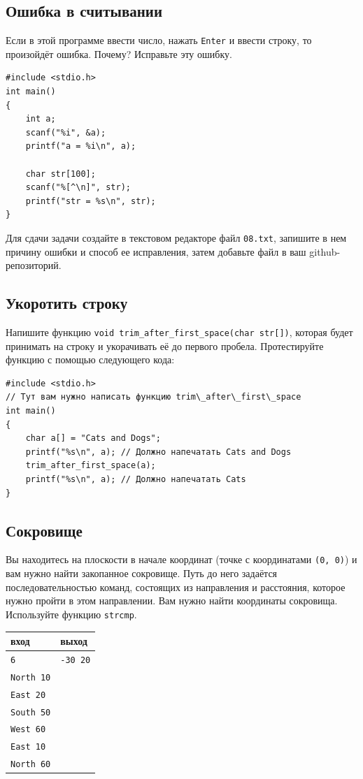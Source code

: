 \documentclass{article}
\begin{document}
\subsection{Ошибка в считывании}
Если в этой программе ввести число, нажать \texttt{Enter} и ввести строку, то произойдёт ошибка. Почему? Исправьте эту ошибку.
\begin{lstlisting}
#include <stdio.h>
int main()
{
    int a;
    scanf("%i", &a);
    printf("a = %i\n", a);

    char str[100];
    scanf("%[^\n]", str);
    printf("str = %s\n", str);
}
\end{lstlisting}
Для сдачи задачи создайте в текстовом редакторе файл \texttt{08.txt}, запишите в нем причину ошибки и способ ее исправления, затем добавьте файл в ваш github-репозиторий.


\subsection{Укоротить строку}
Напишите функцию \texttt{void trim\_after\_first\_space(char str[])}, которая будет принимать на строку и укорачивать её до первого пробела. Протестируйте функцию с помощью следующего кода:
\begin{lstlisting}
#include <stdio.h>
// Тут вам нужно написать функцию trim\_after\_first\_space
int main() 
{
    char a[] = "Cats and Dogs";
    printf("%s\n", a); // Должно напечатать Cats and Dogs
    trim_after_first_space(a);
    printf("%s\n", a); // Должно напечатать Cats
}
\end{lstlisting}


\subsection{Сокровище}
Вы находитесь на плоскости в начале координат (точке с координатами \texttt{(0, 0)}) и вам нужно найти закопанное сокровище. Путь до него задаётся последовательностью команд, состоящих из направления и расстояния, которое нужно пройти в этом направлении. Вам нужно найти координаты сокровища. Используйте функцию \texttt{strcmp}.
\begin{center} 
\begin{tabular}{ l | l }
 вход & выход \\ \hline
 \texttt{6} & \texttt{-30 20}\\
 \texttt{North 10} & \\
 \texttt{East 20} &\\
 \texttt{South 50} &\\
 \texttt{West 60} &\\
 \texttt{East 10} &\\
 \texttt{North 60} &\\
\end{tabular}
\end{center}
\end{document}
